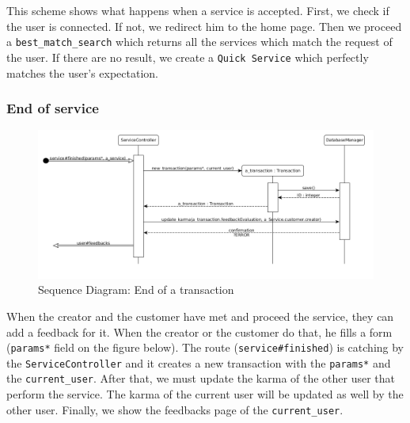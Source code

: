 This scheme shows what happens when a service is accepted. First, we check if the user is connected.
If not, we redirect him to the home page. 
Then we proceed a \texttt{best\_match\_search} which returns all the services which match the request of the user.
If there are no result, we create a \texttt{Quick Service} which perfectly matches the user's expectation.

\subsubsection{End of service}
\begin{figure}[H]
	\begin{center}
		\includegraphics[width=.9\textwidth]{end_of_service.png}
		\caption{Sequence Diagram: End of a transaction}
		\label{fig:end_of_service}
	\end{center}
\end{figure}

When the creator and the customer have met and proceed the service, they can add a feedback for it.
When the creator or the customer do that, he fills a form (\texttt{params*} field on the figure below).  The route (\texttt{service\#finished}) is catching by the \texttt{ServiceController} and it creates a new transaction with the \texttt{params*} and the \texttt{current\_user}.
After that, we must update the karma of the other user that perform the service. The karma of the current user will be updated as well by the other
user.
Finally, we show the feedbacks page of the \texttt{current\_user}.


